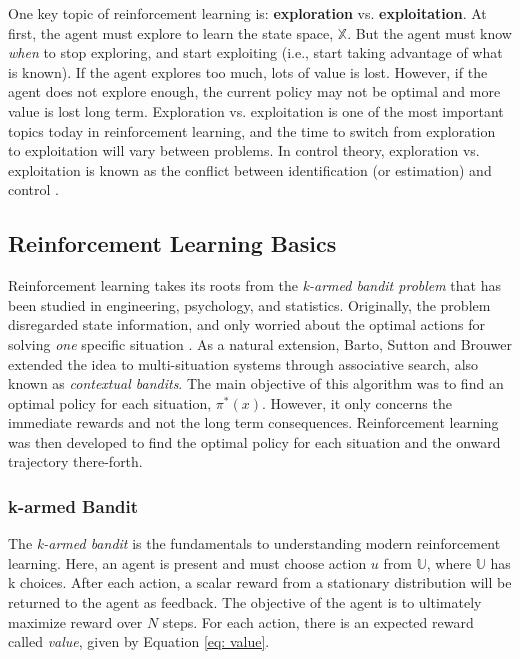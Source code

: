 One key topic of reinforcement learning is: \textbf{exploration} vs. \textbf{exploitation}.  At first, the agent must explore to learn the state space, $\mathbb{X}$.  But the agent must know \textit{when} to stop exploring, and start exploiting (i.e., start taking advantage of what is known).  If the agent explores too much, lots of value is lost.  However, if the agent does not explore enough, the current policy may not be optimal and more value is lost long term.  Exploration vs. exploitation is one of the most important topics today in reinforcement learning, and the time to switch from exploration to exploitation will vary between problems.  In control theory, exploration vs. exploitation is known as the conflict between identification (or estimation) and control \cite{explorevexploitcontrol}.  

\subsection{Reinforcement Learning Basics}

Reinforcement learning takes its roots from the \textit{k-armed bandit problem} that has been studied in engineering, psychology, and statistics.  Originally, the problem disregarded state information, and only worried about the optimal actions for solving \textit{one} specific situation \cite{thompson1, thompson2, robbins, bellman_bandit}.  As a natural extension, Barto, Sutton and Brouwer extended the idea to multi-situation systems \cite{bartosuttonbrouwer} through associative search, also known as \textit{contextual bandits}. The main objective of this algorithm was to find an optimal policy for each situation, $\pi^*(x)$.  However, it only concerns the immediate rewards and not the long term consequences.  Reinforcement learning was then developed to find the optimal policy for each situation and the onward trajectory there-forth.  

\subsubsection{k-armed Bandit}

The \textit{k-armed bandit} is the fundamentals to understanding modern reinforcement learning.  Here, an agent is present and must choose action $u$ from $\mathbb{U}$, where $\mathbb{U}$ has k choices.  After each action, a scalar reward from a stationary distribution will be returned to the agent as feedback.  The objective of the agent is to ultimately maximize reward over $N$ steps.  For each action, there is an expected reward called \textit{value}, given by Equation \ref{eq: value}.

